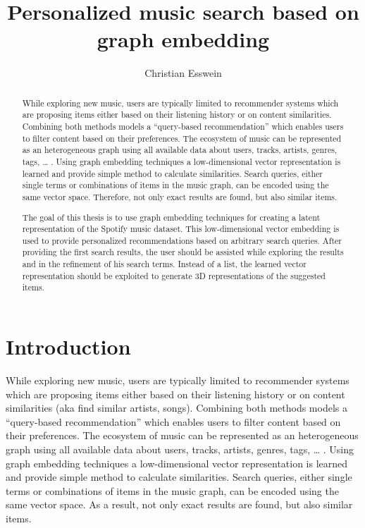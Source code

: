 \documentclass[a4paper]{llncs}
\title{Personalized music search based on graph embedding}
\author{Christian Esswein}
\institute{christian.esswein@student.uibk.ac.at}
\begin{document}
	
	\maketitle
	
	\begin{abstract}
		While exploring new music, users are typically limited to recommender systems which are proposing items either based on their listening history or on content similarities. Combining both methods models a “query-based recommendation” which enables users to filter content based on their preferences.
		The ecosystem of music can be represented as an heterogeneous graph using all available data about users, tracks, artists, genres, tags, … . Using graph embedding techniques a low-dimensional vector representation is learned and provide simple method to calculate similarities. Search queries, either single terms or combinations of items in the music graph, can be encoded using the same vector space. Therefore, not only exact results are found, but also similar items.
		
		
		The goal of this thesis is to use graph embedding techniques for creating a latent representation of the Spotify music dataset. This low-dimensional vector embedding is used to provide personalized recommendations based on arbitrary search queries. After providing the first search results, the user should be assisted while exploring the results and in the refinement of his search terms. Instead of a list, the learned vector representation should be exploited to generate 3D representations of the suggested items.
		
		
	\end{abstract}
	
	\section{Introduction}
	While exploring new music, users are typically limited to recommender systems which are proposing items either based on their listening history or on content similarities (aka find similar artists, songs). Combining both methods models a “query-based recommendation” which enables users to filter content based on their preferences.
	The ecosystem of music can be represented as an heterogeneous graph using all available data about users, tracks, artists, genres, tags, … . Using graph embedding techniques a low-dimensional vector representation is learned and provide simple method to calculate similarities. Search queries, either single terms or combinations of items in the music graph, can be encoded using the same vector space. As a result, not only exact results are found, but also similar items.
	
\end{document}
